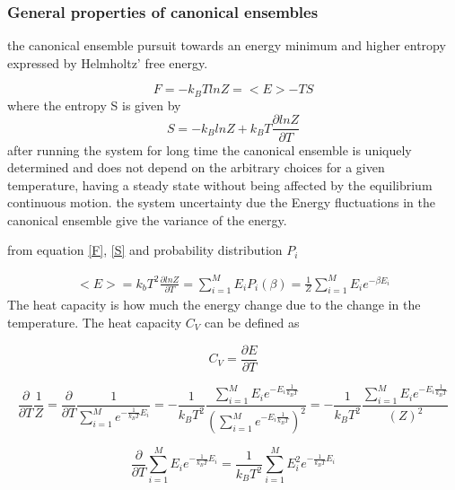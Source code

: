\documentclass[10pt,a4paper]{article}
\begin{document}
\subsubsection{General properties of canonical ensembles}
the canonical ensemble pursuit towards an energy minimum and higher entropy expressed by Helmholtz' free energy.

\begin{equation}
F=-k_BTlnZ = <E>-TS \label{F}
\end{equation}
where the entropy S is given by
\begin{equation}
S=-k_BlnZ + k_B T \frac{\partial lnZ}{\partial T}\label{S}
\end{equation}
after running the system for long time the canonical ensemble is uniquely determined and does not depend on the arbitrary choices for a given temperature, having a steady state without being affected by the equilibrium continuous motion.
the system uncertainty  due the Energy fluctuations in the canonical ensemble give the variance of the energy.\\
 
\centerline{ from equation \ref{F}, \ref{S} and probability distribution $P_i$ }
\begin{align}
<E> = k_b T^2 \frac{\partial lnZ}{\partial T}=\sum_{i=1}^{M} E_iP_i(\beta)=\frac{1}{Z }\sum_{i=1}^{M}E_i e ^{ - \beta E_i}
\end{align}
The heat capacity is how much the energy change due to the change in the temperature. The heat capacity $C_V$ can be defined as

\begin{equation}
C_V =\frac{\partial E}{\partial T} 
\end{equation}

\begin{equation}
\frac{\partial}{\partial T}\frac{1}{Z} = \frac{\partial}{\partial T}\frac{1}{\sum_{i=1}^{M}e^{- \frac{1}{k_BT} E_i}} = -\frac{1}{k_B T^2 } \frac{\sum_{i=1}^{M} E_i e^{-E_i \frac{1}{k_BT}}}{\left(\sum_{i=1}^{M} e^{-E_i \frac{1}{k_BT}} \right)^2}=-\frac{1}{k_B T^2 } \frac{\sum_{i=1}^{M} E_i e^{-E_i \frac{1}{k_BT}}}{\left( Z\right)^2}
\end{equation}

\begin{equation}
\frac{\partial}{\partial T}\sum_{i=1}^{M}E_i e ^{ - \frac {1}{k_BT} E_i} = \frac{1}{k_BT^2}\sum_{i=1}^{M}E_i^2 e ^{ - \frac {1}{k_BT} E_i}
\end{equation}
\end{document}
